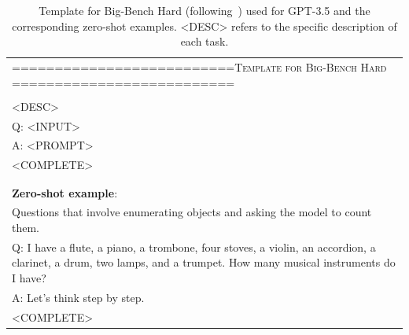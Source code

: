 \begin{table}[!htbp]
\small
    \centering
    \colorbox{gray!8}{
    \begin{tabular}{@{}p{14cm}}
    \toprule
    ==========================\textsc{Template for Big-Bench Hard} ==========================\\\\
    <DESC>\\
    Q: <INPUT>\\
    A:  <PROMPT>\\
    <COMPLETE>\\\\
    \midrule \\
    \textbf{Zero-shot example}: \\
    Questions that involve enumerating objects and asking the model to count them.\\
    Q: I have a flute, a piano, a trombone, four stoves, a violin, an accordion, a clarinet, a drum, two lamps, and a trumpet. How many musical instruments do I have? \\
    A: Let's think step by step. \\
    <COMPLETE>\\

    
    \bottomrule  
    \end{tabular}
    }
    \caption{Template for Big-Bench Hard (following~\citet{suzgun2022challenging}) used for GPT-3.5 and the corresponding zero-shot examples. <DESC> refers to the specific description of each task.}
    \label{tab:gpt-bbh-temp}
\end{table}